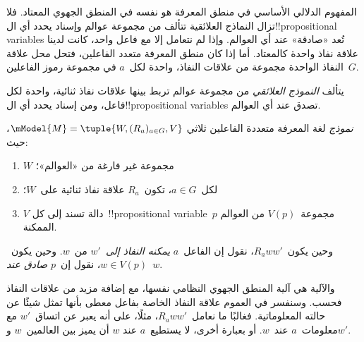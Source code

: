 \documentclass[../../../include/open-logic-section]{subfiles}
\begin{document}


المفهوم الدلالي الأساسي في منطق المعرفة هو نفسه في المنطق الجهوي المعتاد.
فلا تزال النماذج العلائقية تتألف من مجموعة عوالم وإسناد يحدد أي
ال!!{propositional variable}s تُعد «صادقة» عند أي العوالم. وإذا لم نتعامل
إلا مع فاعل واحد، كانت لدينا علاقة نفاذ واحدة كالمعتاد. أما إذا كان منطق
المعرفة متعدد الفاعلين، فتحل محل علاقة النفاذ الواحدة مجموعة من علاقات
النفاذ، واحدة لكل~$a$ في مجموعة رموز الفاعلين~$G$.

يتألف \emph{النموذج العلائقي} من مجموعة عوالم تربط بينها علاقات نفاذ
ثنائية، واحدة لكل فاعل، ومن إسناد يحدد أي ال!!{propositional variable}s
تصدق عند أي العوالم.

\begin{defn}
  \emph{نموذج} لغة المعرفة متعددة الفاعلين ثلاثي
  $\mModel{M}=\tuple{W,(R_a)_{a \in G},V}$، حيث:
  \begin{enumerate}
  \item $W$ مجموعة غير فارغة من «العوالم»؛
  \item لكل~$a \in G$، تكون~${R}_a$ علاقة نفاذ ثنائية على~$W$؛
  \item $V$ دالة تسند إلى كل~!!{propositional
    variable}~$p$ مجموعة~$V(p)$ من العوالم الممكنة.
  \end{enumerate}
  وحين يكون~$R_a ww'$، نقول إن الفاعل~$a$ \emph{يمكنه النفاذ إلى}~$w'$
  من~$w$. وحين يكون~$w \in V(p)$، نقول إن~$p$ \emph{صادق عند}~$w$.
\end{defn}

والآلية هي آلية المنطق الجهوي النظامي نفسها، مع إضافة مزيد من علاقات النفاذ
فحسب. وسنفسر في العموم علاقة النفاذ الخاصة بفاعل معطى بأنها تمثل شيئًا عن
حالته المعلوماتية. فغالبًا ما نعامل~$R_a ww'$، مثلًا، على أنه يعبر عن
اتساق~$w'$ مع معلومات~$a$ عند~$w$. أو بعبارة أخرى، لا يستطيع~$a$ عند
$w$ أن يميز بين العالمين~$w$ و$w'$.
\end{document}

